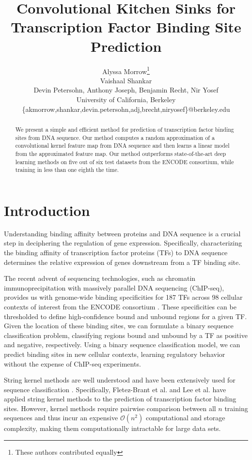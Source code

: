 \documentclass{article}
\title{Convolutional Kitchen Sinks for Transcription Factor Binding Site Prediction}
\author{
  Alyssa Morrow\thanks{These authors contributed equally} \\
  \And
  Vaishaal Shankar\samethanks \\
  \AND
  Devin Petersohn, Anthony Joseph, Benjamin Recht, Nir Yosef \\
  University of California, Berkeley \\
  \{akmorrow,shankar,devin.petersohn,adj,brecht,niryosef\}@berkeley.edu \\
}
\begin{document}
\maketitle
\begin{abstract}
We present a simple and efficient method for prediction of transcription factor binding sites from DNA sequence. Our method computes a random approximation of a convolutional kernel feature map from DNA sequence and then learns a linear
model from the approximated feature map. Our method outperforms state-of-the-art deep learning methods on five out of six test datasets from the ENCODE consortium, while training in less than one eighth the time.
\end{abstract}

\section{Introduction}
Understanding binding affinity between proteins and DNA sequence is a crucial step in deciphering
the regulation of gene expression. Specifically, characterizing the binding affinity of transcription factor proteins (TFs) to DNA sequence determines the relative expression of genes downstream from a TF binding site.

The recent advent of sequencing technologies,
such as chromatin immunoprecipitation with massively parallel DNA sequencing (ChIP-seq),
provides us with genome-wide binding specificities for 187 TFs across
98 cellular contexts of interest from the ENCODE consortium \cite{encode2004encode}. These specificities
can be thresholded to define high-confidence bound and unbound regions for a given TF. Given the location of these binding sites, we can formulate a binary sequence classification problem, classifying regions bound and unbound by a TF as positive and negative, respectively.
Using a binary sequence classification model, we can predict binding sites in new cellular contexts,
learning regulatory behavior without the expense of ChIP-seq experiments.

String kernel methods are well understood and have been extensively used for sequence classification
\cite{jaakkola1999using, eskin2002mismatch, leslie2002spectrum}.
Specifically, Fletez-Brant et al. and Lee et al. \cite{fletez2013kmer, lee2015method} have applied string kernel methods
to the prediction of transcription factor binding sites.
However, kernel methods require pairwise comparison
between all $n$ training sequences and thus incur an expensive $\mathcal{O}(n^{2})$ computational and storage complexity,
making them computationally intractable for large data sets.
\end{document}
